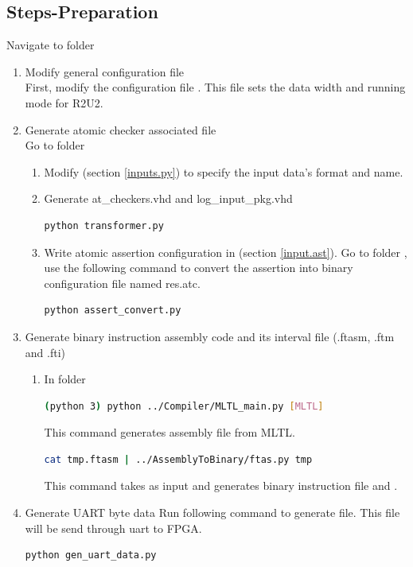 \subsection{Steps-Preparation}
Navigate to folder 
\begin{enumerate}
\item Modify general configuration file \\
	First, modify the configuration file . This file sets the data width and running mode for R2U2.
\item Generate atomic checker associated file\\
	Go to folder 
	\begin{enumerate}
		\item Modify  (section \ref{inputs.py}) to specify the input data's format and name.
		\item Generate \textcolor{purple!30}{at\_checkers.vhd} and \textcolor{purple!30}{log\_input\_pkg.vhd}
		\begin{lstlisting}[language=Bash]
python transformer.py
		\end{lstlisting}
		\item Write atomic assertion configuration in  (section \ref{input.ast}). 
		Go to folder , use the following command to convert the assertion into binary configuration file named \textcolor{purple!30}{res.atc}.
		\begin{lstlisting}[language=Bash]
python assert_convert.py
		\end{lstlisting}
	\end{enumerate}
\item Generate binary instruction assembly code and its interval file (.ftasm, .ftm and .fti)
	\begin{enumerate}
		\item In folder 
		\begin{lstlisting}[language=Bash]
(python 3) python ../Compiler/MLTL_main.py [MLTL]
		\end{lstlisting}
		This command generates assembly file  from MLTL.
		\begin{lstlisting}[language=Bash]
cat tmp.ftasm | ../AssemblyToBinary/ftas.py tmp
		\end{lstlisting}
			This command takes  as input and generates binary instruction file  and .
	\end{enumerate}
\item Generate UART byte data
		Run following command to generate  file. This file will be send through uart to FPGA.
		\begin{lstlisting}[language=Bash]
python gen_uart_data.py
		\end{lstlisting}		
\end{enumerate}

